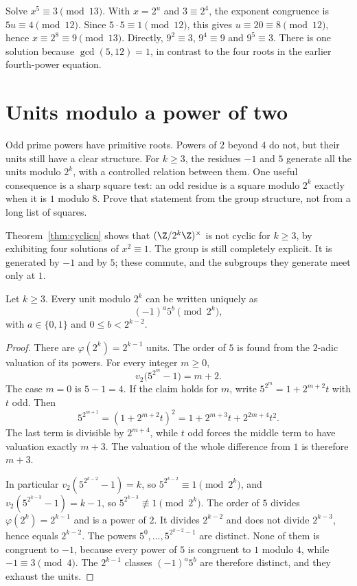 \begin{examplex}
Solve $x^5\equiv3\pmod{13}$. With $x=2^u$ and $3\equiv2^4$, the exponent congruence is $5u\equiv4\pmod{12}$. Since $5\cdot5\equiv1\pmod{12}$, this gives $u\equiv20\equiv8\pmod{12}$, hence $x\equiv2^8\equiv9\pmod{13}$. Directly, $9^2\equiv3$, $9^4\equiv9$ and $9^5\equiv3$. There is one solution because $\gcd(5,12)=1$, in contrast to the four roots in the earlier fourth-power equation.
\end{examplex}

\section{Units modulo a power of two}

Odd prime powers have primitive roots. Powers of $2$ beyond $4$ do not, but their units still have a clear structure. For $k\ge3$, the residues $-1$ and $5$ generate all the units modulo $2^k$, with a controlled relation between them. One useful consequence is a sharp square test: an odd residue is a square modulo $2^k$ exactly when it is $1$ modulo $8$. Prove that statement from the group structure, not from a long list of squares.

Theorem~\ref{thm:cyclicn} shows that $(\Z/2^k\Z)^\times$ is not cyclic for $k\ge3$, by exhibiting four solutions of $x^2\equiv1$. The group is still completely explicit. It is generated by $-1$ and by $5$; these commute, and the subgroups they generate meet only at $1$.

\begin{theorem}\label{thm:twopower}
Let $k\ge3$. Every unit modulo $2^k$ can be written uniquely as
\[
(-1)^a5^b\pmod{2^k},
\]
with $a\in\{0,1\}$ and $0\le b<2^{k-2}$.
\end{theorem}
\begin{proof}
There are $\varphi(2^k)=2^{k-1}$ units. The order of $5$ is found from the $2$-adic valuation of its powers. For every integer $m\ge0$,
\[
v_2\bigl(5^{2^m}-1\bigr)=m+2.
\]
The case $m=0$ is $5-1=4$. If the claim holds for $m$, write $5^{2^m}=1+2^{m+2}t$ with $t$ odd. Then
\[
5^{2^{m+1}}=(1+2^{m+2}t)^2=1+2^{m+3}t+2^{2m+4}t^2.
\]
The last term is divisible by $2^{m+4}$, while $t$ odd forces the middle term to have valuation exactly $m+3$. The valuation of the whole difference from $1$ is therefore $m+3$.

In particular $v_2(5^{2^{k-2}}-1)=k$, so $5^{2^{k-2}}\equiv1\pmod{2^k}$, and $v_2(5^{2^{k-3}}-1)=k-1$, so $5^{2^{k-3}}\not\equiv1\pmod{2^k}$. The order of $5$ divides $\varphi(2^k)=2^{k-1}$ and is a power of $2$. It divides $2^{k-2}$ and does not divide $2^{k-3}$, hence equals $2^{k-2}$. The powers $5^0,\dots,5^{2^{k-2}-1}$ are distinct. None of them is congruent to $-1$, because every power of $5$ is congruent to $1$ modulo $4$, while $-1\equiv3\pmod4$. The $2^{k-1}$ classes $(-1)^a5^b$ are therefore distinct, and they exhaust the units.
\end{proof}

